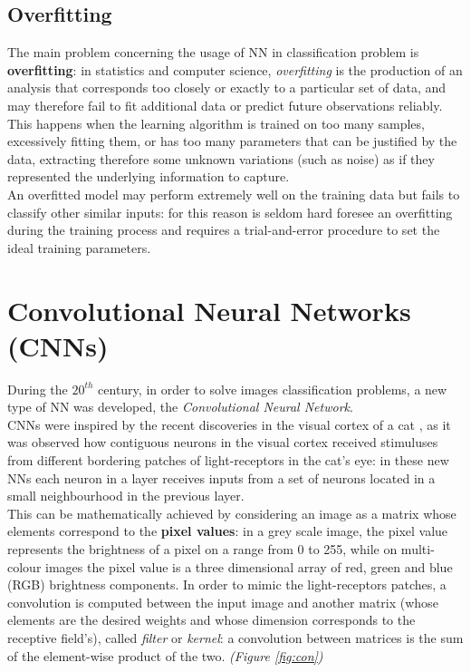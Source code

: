 \documentclass[../main.tex]{subfiles}
\begin{document}
\subsection{Overfitting}
The main problem concerning the usage of NN in classification problem is \textbf{overfitting}: in statistics and computer science, \textit{overfitting} is the production of an analysis that corresponds too closely or exactly to a particular set of data, and may therefore fail to fit additional data or predict future observations reliably.  \\ 
This happens when the learning algorithm is trained on too many samples, excessively fitting them, or has too many parameters that can be justified by the data, extracting therefore some unknown variations (such as noise) as if they represented the underlying information to capture. \\
An overfitted model may perform extremely well on the training data but fails to classify other similar inputs: for this reason is seldom hard foresee an overfitting during the training process and requires a trial-and-error procedure to set the ideal training parameters.  

\vspace{5mm}
\section{Convolutional Neural Networks (CNNs)}
During the $20^{th}$ century, in order to solve images classification problems, a new type of NN was developed, the \textit{Convolutional Neural Network}. \\
CNNs were inspired by the recent discoveries in the visual cortex of a cat \cite{Hubel1962}, as it was observed how contiguous neurons in the visual cortex received stimuluses from different bordering patches of light-receptors in the cat's eye: in these new NNs each neuron in a layer receives inputs from a set of neurons located in a small neighbourhood in the previous layer.  \\
This can be mathematically achieved by considering an image as a matrix whose elements correspond to the \textbf{pixel values}: in a grey scale image, the pixel value represents the brightness of a pixel on a range from 0 to 255, while on multi-colour images the pixel value is a three dimensional array of red, green and blue (RGB) brightness components.  
In order to mimic the light-receptors patches, a convolution is computed between the input image and another matrix (whose elements are the desired weights and whose dimension corresponds to the receptive field's), called \textit{filter} or \textit{kernel}: a convolution between matrices is the sum of the element-wise product of the two.  \textit{(Figure \ref{fig:con})} \\
\end{document}
